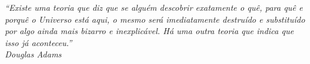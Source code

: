 \begin{epigrafe}
    \vspace*{\fill}
	\begin{flushright}
		\textit{``Existe uma teoria que diz que se alguém descobrir exatamente o quê, para quê e porquê
			o Universo está aqui, o mesmo será imediatamente destruído e substituído por algo
			ainda mais bizarro e inexplicável. Há uma outra teoria que indica que isso já
			aconteceu.''\\
		Douglas Adams}
	\end{flushright}
\end{epigrafe}
